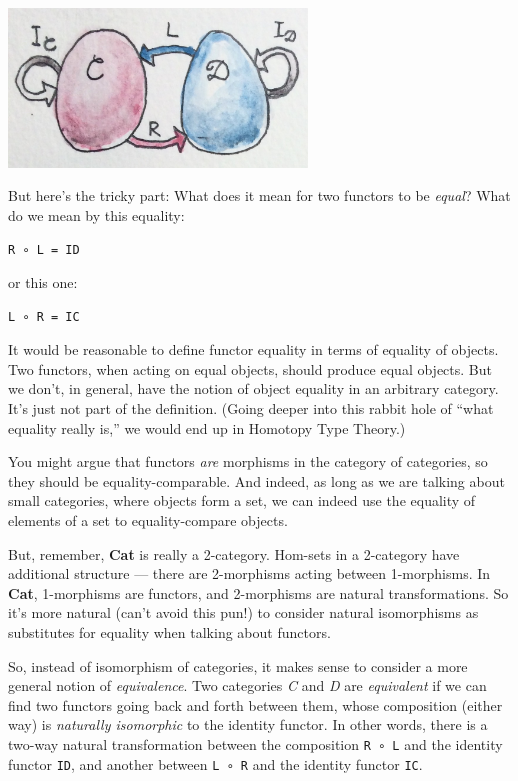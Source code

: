 \includegraphics[width=3.12500in]{images/adj-1.jpg}

But here's the tricky part: What does it mean for two functors to be
\emph{equal}? What do we mean by this equality:

\begin{verbatim}
R ∘ L = ID
\end{verbatim}

or this one:

\begin{verbatim}
L ∘ R = IC
\end{verbatim}

It would be reasonable to define functor equality in terms of equality
of objects. Two functors, when acting on equal objects, should produce
equal objects. But we don't, in general, have the notion of object
equality in an arbitrary category. It's just not part of the definition.
(Going deeper into this rabbit hole of ``what equality really is,'' we
would end up in Homotopy Type Theory.)

You might argue that functors \emph{are} morphisms in the category of
categories, so they should be equality-comparable. And indeed, as long
as we are talking about small categories, where objects form a set, we
can indeed use the equality of elements of a set to equality-compare
objects.

But, remember, \textbf{Cat} is really a 2-category. Hom-sets in a
2-category have additional structure --- there are 2-morphisms acting
between 1-morphisms. In \textbf{Cat}, 1-morphisms are functors, and
2-morphisms are natural transformations. So it's more natural (can't
avoid this pun!) to consider natural isomorphisms as substitutes for
equality when talking about functors.

So, instead of isomorphism of categories, it makes sense to consider a
more general notion of \emph{equivalence}. Two categories \emph{C} and
\emph{D} are \emph{equivalent} if we can find two functors going back
and forth between them, whose composition (either way) is
\emph{naturally isomorphic} to the identity functor. In other words,
there is a two-way natural transformation between the composition
\texttt{R\ ∘\ L} and the identity functor \texttt{ID}, and another
between \texttt{L\ ∘\ R} and the identity functor \texttt{IC}.

